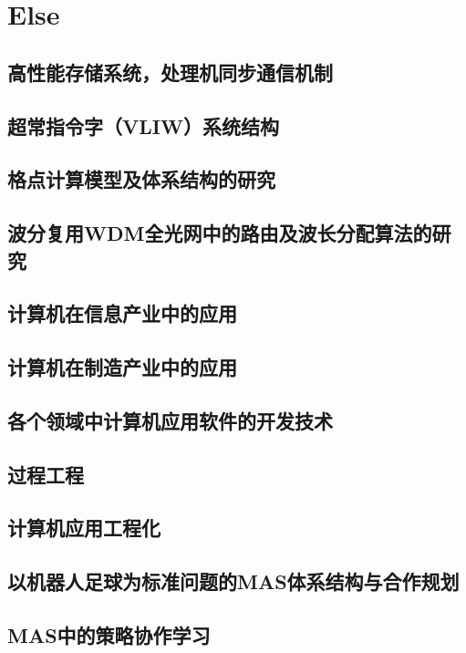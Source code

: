 

\chapter{Else}

\section{高性能存储系统，处理机同步通信机制}
\section{超常指令字（VLIW）系统结构}
\section{格点计算模型及体系结构的研究}
\section{波分复用WDM全光网中的路由及波长分配算法的研究}
\section{计算机在信息产业中的应用}
\section{计算机在制造产业中的应用}
\section{各个领域中计算机应用软件的开发技术}
\section{过程工程}
\section{计算机应用工程化}
\section{以机器人足球为标准问题的MAS体系结构与合作规划}
\section{MAS中的策略协作学习}
